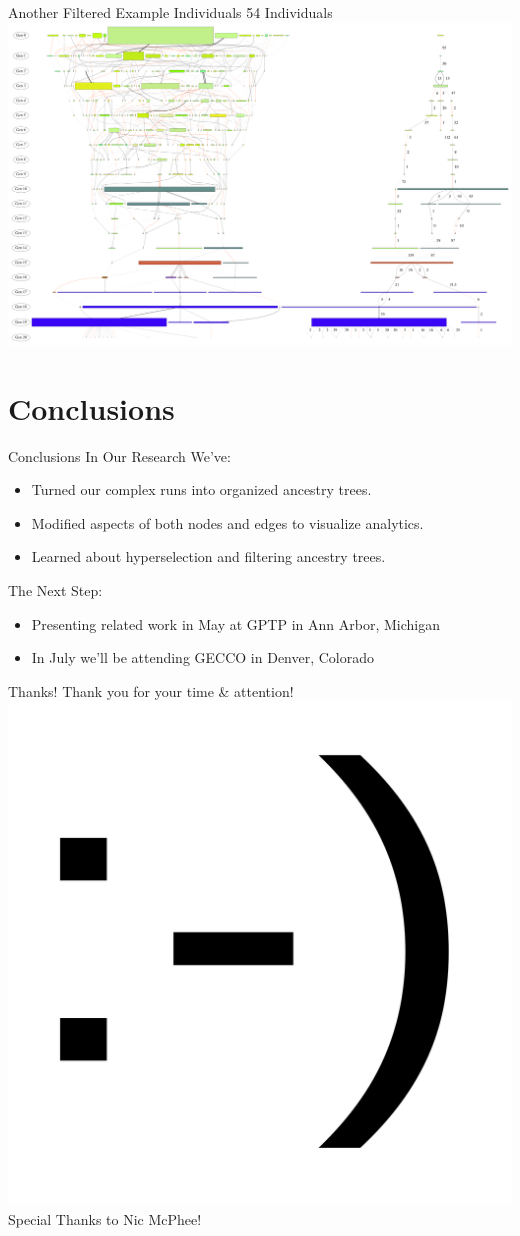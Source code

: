 \documentclass{beamer}
\begin{document}
\begin{frame}{Another Filtered Example}
 Individuals \hspace{4.5cm} 54 Individuals \\
\includegraphics[height=.8\textheight]{Illustrations/run0_RBM_color_both_runs_40.pdf} 
\end{frame}

\section{Conclusions}
\begin{frame}{Conclusions}
In Our Research We've:
\begin{itemize}
\item Turned our complex runs into organized ancestry trees.
\item Modified aspects of both nodes and edges to visualize analytics.
\item Learned about hyperselection and filtering ancestry trees.
\end{itemize}
\vspace{.5cm}
The Next Step:
\begin{itemize}
\item Presenting related work in May at GPTP in Ann Arbor, Michigan
\item In July we'll be attending GECCO in Denver, Colorado
\end{itemize}
\end{frame}

\begin{frame}{Thanks!}
\center \Large
Thank you for your time \& attention! \\ \medskip
\includegraphics[width=.2\textwidth]{Illustrations/smile.png} \\ \medskip
Special Thanks to Nic McPhee!  
\end{frame}
\end{document}
